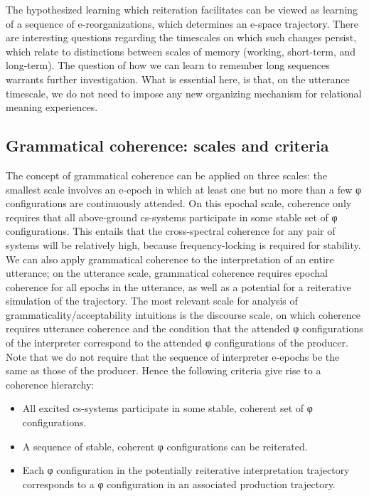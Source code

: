   The hypothesized learning which reiteration facilitates can be viewed as learning of a sequence of e-reorganizations, which determines an e-space trajectory. There are interesting questions regarding the timescales on which such changes persist, which relate to distinctions between scales of memory (working, short-term, and long-term). The question of how we can learn to remember long sequences warrants further investigation. What is essential here, is that, on the utterance timescale, we do not need to impose any new organizing mechanism for relational meaning experiences. 

\subsection{Grammatical coherence: scales and criteria}

The concept of grammatical coherence can be applied on three scales: the smallest scale involves an e-epoch in which at least one but no more than a few φ configurations are continuously attended. On this epochal scale, coherence only requires that all above-ground cs-systems participate in some stable set of φ configurations. This entails that the cross-spectral coherence for any pair of systems will be relatively high, because frequency-locking is required for stability. We can also apply grammatical coherence to the interpretation of an entire utterance; on the utterance scale, grammatical coherence requires epochal coherence for all epochs in the utterance, as well as a potential for a reiterative simulation of the trajectory. The most relevant scale for analysis of grammaticality/acceptability intuitions is the discourse scale, on which coherence requires utterance coherence and the condition that the attended φ configurations of the interpreter correspond to the attended φ configurations of the producer. Note that we do not require that the sequence of interpreter e-epochs be the same as those of the producer. Hence the following criteria give rise to a coherence hierarchy:

\begin{itemize}
\item 
All excited cs-systems participate in some stable, coherent set of φ configurations.
\item 
A sequence of stable, coherent φ configurations can be reiterated.
\item 
Each φ configuration in the potentially reiterative interpretation trajectory corresponds to a φ configuration in an associated production trajectory.
\end{itemize}

